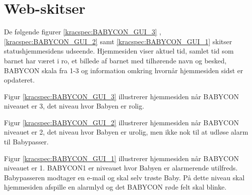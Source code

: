 \section{Web-skitser}


De følgende figurer \ref{kracspec:BABYCON_GUI_3} , \ref{kracspec:BABYCON_GUI_2} samt \ref{kracspec:BABYCON_GUI_1} skitser statushjemmesidens udseende. Hjemmesiden viser aktuel tid, samlet tid som barnet har været i ro, et billede af barnet med tilhørende navn og besked, BABYCON skala fra 1-3 og information omkring hvornår hjemmesiden sidst er opdateret.


Figur \ref{kracspec:BABYCON_GUI_3} illustrerer hjemmesiden når BABYCON niveauet er 3, det niveau hvor Babyen er rolig.


Figur \ref{kracspec:BABYCON_GUI_2} illustrerer hjemmesiden når BABYCON niveauet er 2, det niveau hvor Babyen er urolig, men ikke nok til at udløse alarm til Babypasser.


Figur \ref{kracspec:BABYCON_GUI_1} illustrerer hjemmesiden når BABYCON niveauet er 1. BABYCON1 er niveauet hvor Babyen er alarmerende utilfreds. Babypasseren modtager en e-mail og skal selv trøste Baby. På dette niveau skal hjemmesiden afspille en alarmlyd og det BABYCON røde felt skal blinke.